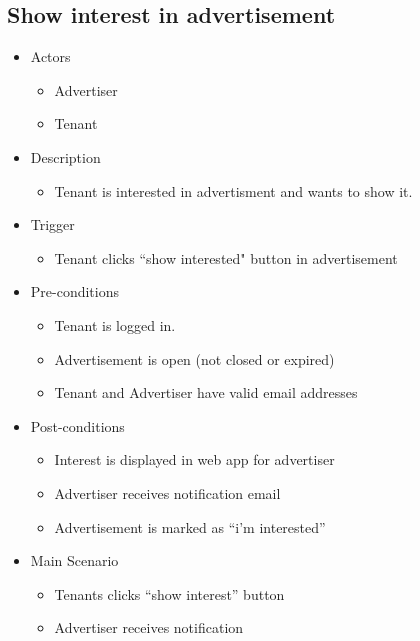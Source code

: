 \documentclass[a4paper,11pt]{article}
\begin{document}
\subsection*{Show interest in advertisement}
\begin{itemize}
  \item Actors
    \begin{itemize}
      \item Advertiser
      \item Tenant
    \end{itemize}
  \item Description
    \begin{itemize}
      \item Tenant is interested in advertisment and wants to show it.
    \end{itemize}
 \item Trigger
    \begin{itemize}
      \item Tenant clicks “show interested" button in advertisement
    \end{itemize}
  \item Pre-conditions
    \begin{itemize}
    \item Tenant is logged in.
    \item Advertisement is open (not closed or expired)
    \item Tenant and Advertiser have valid email addresses
    \end{itemize}
  \item Post-conditions
    \begin{itemize}
      \item Interest is displayed in web app for advertiser
      \item Advertiser receives notification email
      \item Advertisement is marked as “i'm interested”
    \end{itemize}
  \item Main Scenario
    \begin{itemize}
      \item Tenants clicks “show interest” button
      \item Advertiser receives notification
    \end{itemize}
\end{itemize}
\end{document}
